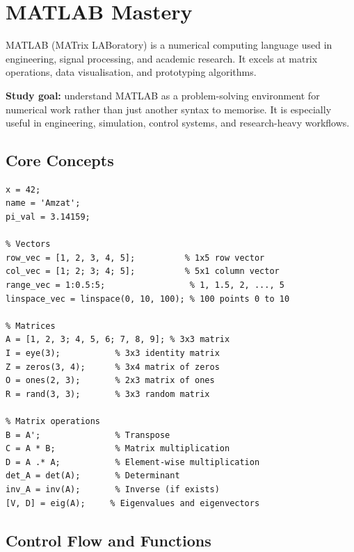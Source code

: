 \documentclass[12pt, a4paper, oneside]{book}
\begin{document}
\chapter{MATLAB Mastery}

MATLAB (MATrix LABoratory) is a numerical computing language used in engineering, signal processing, and academic research. It excels at matrix operations, data visualisation, and prototyping algorithms.

\begin{studybox}
\textbf{Study goal:} understand MATLAB as a problem-solving environment for numerical work rather than just another syntax to memorise. It is especially useful in engineering, simulation, control systems, and research-heavy workflows.
\end{studybox}

\section{Core Concepts}

\begin{lstlisting}[caption={MATLAB basics}]
% Variables (no declaration needed)
x = 42;
name = 'Amzat';
pi_val = 3.14159;

% Vectors
row_vec = [1, 2, 3, 4, 5];          % 1x5 row vector
col_vec = [1; 2; 3; 4; 5];          % 5x1 column vector
range_vec = 1:0.5:5;                 % 1, 1.5, 2, ..., 5
linspace_vec = linspace(0, 10, 100); % 100 points 0 to 10

% Matrices
A = [1, 2, 3; 4, 5, 6; 7, 8, 9]; % 3x3 matrix
I = eye(3);           % 3x3 identity matrix
Z = zeros(3, 4);      % 3x4 matrix of zeros
O = ones(2, 3);       % 2x3 matrix of ones
R = rand(3, 3);       % 3x3 random matrix

% Matrix operations
B = A';               % Transpose
C = A * B;            % Matrix multiplication
D = A .* A;           % Element-wise multiplication
det_A = det(A);       % Determinant
inv_A = inv(A);       % Inverse (if exists)
[V, D] = eig(A);     % Eigenvalues and eigenvectors
\end{lstlisting}

\section{Control Flow and Functions}
\end{document}
